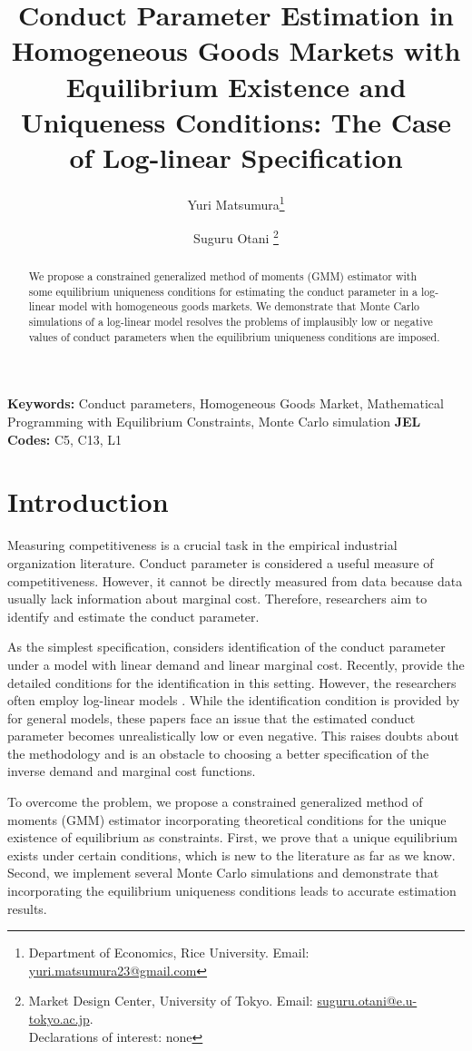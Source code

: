 \documentclass[11pt, a4paper]{article}
\title{Conduct Parameter Estimation in Homogeneous Goods Markets with Equilibrium Existence and Uniqueness Conditions: The Case of Log-linear Specification}
\author{Yuri Matsumura\thanks{Department of Economics, Rice University. Email: \href{mailto:}{yuri.matsumura23@gmail.com}} \and Suguru Otani \thanks{Market Design Center, University of Tokyo. Email: \href{mailto:}{suguru.otani@e.u-tokyo.ac.jp}.
\\Declarations of interest: none %
}}
\theoremstyle{remark}
\begin{document}
\maketitle
\begin{abstract}
    We propose a constrained generalized method of moments (GMM) estimator with some equilibrium uniqueness conditions for estimating the conduct parameter in a log-linear model with homogeneous goods markets. 
    We demonstrate that Monte Carlo simulations of a log-linear model resolves the problems of implausibly low or negative values of conduct parameters when the equilibrium uniqueness conditions are imposed.
\end{abstract}

\noindent\textbf{Keywords:} Conduct parameters, Homogeneous Goods Market, Mathematical Programming with Equilibrium Constraints, Monte Carlo simulation
\vspace{0in}
\newline
\noindent\textbf{JEL Codes:} C5, C13, L1

\bigskip


\section{Introduction}
Measuring competitiveness is a crucial task in the empirical industrial organization literature.
Conduct parameter is considered a useful measure of competitiveness. 
However, it cannot be directly measured from data because data usually lack information about marginal cost.
Therefore, researchers aim to identify and estimate the conduct parameter.

As the simplest specification, \citet{bresnahan1982oligopoly} considers identification of the conduct parameter under a model with linear demand and linear marginal cost.
Recently, \cite{matsumura2023resolving} provide the detailed conditions for the identification in this setting. 
However, the researchers often employ log-linear models \citep{okazaki2022excess,merel2009measuring}. 
While the identification condition is provided by \citet{lau1982identifying} for general models, these papers face an issue that the estimated conduct parameter becomes unrealistically low or even negative.
This raises doubts about the methodology and is an obstacle to choosing a better specification of the inverse demand and marginal cost functions.

To overcome the problem, we propose a constrained generalized method of moments (GMM) estimator incorporating theoretical conditions for the unique existence of equilibrium as constraints. 
First, we prove that a unique equilibrium exists under certain conditions, which is new to the literature as far as we know.
Second, we implement several Monte Carlo simulations and demonstrate that incorporating the equilibrium uniqueness conditions leads to accurate estimation results. 
\end{document}
